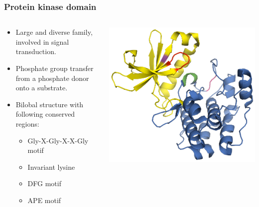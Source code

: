 \documentclass{beamer}
\begin{document}
  \begin{frame}
    \frametitle{Protein kinase domain}

    \begin{columns}

      \begin{column}{0.5\textwidth}
        \begin{itemize}
          \item Large and diverse family, involved in signal transduction.
          \item Phosphate group transfer from a phosphate donor onto a substrate.
          \item Bilobal structure with following conserved regions:
          \begin{itemize}
            \item Gly-X-Gly-X-X-Gly motif
            \item Invariant lysine
            \item DFG motif
            \item APE motif
          \end{itemize}
        \end{itemize}
      \end{column}

      \begin{column}{0.5\textwidth}
        \begin{center}
          \includegraphics[width=\textwidth]{img/aurora.png}
        \end{center}
      \end{column}

    \end{columns}

  \end{frame}
\end{document}
